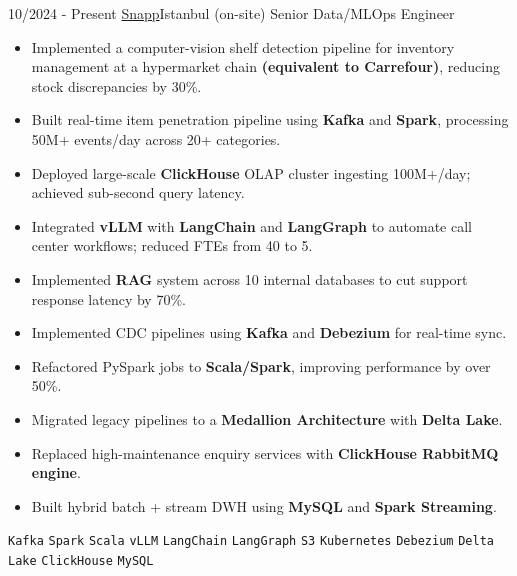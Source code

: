 \documentclass[9pt]{developercv} %
\begin{document}
\vspace{-5pt}
\begin{entrylist}
  \entry
    {10/2024 - Present}
    {\href{https://snapp.ir}{Snapp}\newline\small\textnormal{Istanbul (on-site)}}
    {Senior Data/MLOps Engineer}
    {\vspace{-6pt}
    \begin{itemize}[itemsep=2pt,topsep=0pt,parsep=0pt,partopsep=0pt, leftmargin=-1pt]
        \item Implemented a computer-vision shelf detection pipeline for inventory management at a hypermarket chain \textbf{(equivalent to Carrefour)}, reducing stock discrepancies by 30\%.
        \item Built real-time item penetration pipeline using \textbf{Kafka} and \textbf{Spark}, processing 50M+ events/day across 20+ categories.
        \item Deployed large-scale \textbf{ClickHouse} OLAP cluster ingesting 100M+/day; achieved sub-second query latency.
        \item Integrated \textbf{vLLM} with \textbf{LangChain} and \textbf{LangGraph} to automate call center workflows; reduced FTEs from 40 to 5.
        \item Implemented \textbf{RAG} system across 10 internal databases to cut support response latency by 70\%.
        \item Implemented CDC pipelines using \textbf{Kafka} and \textbf{Debezium} for real-time sync.
        \item Refactored PySpark jobs to \textbf{Scala/Spark}, improving performance by over 50\%.
        \item Migrated legacy pipelines to a \textbf{Medallion Architecture} with \textbf{Delta Lake}.
        \item Replaced high-maintenance enquiry services with \textbf{ClickHouse RabbitMQ engine}.
        \item Built hybrid batch + stream DWH using \textbf{MySQL} and \textbf{Spark Streaming}.
    \end{itemize}
    \vspace{2pt}
    \texttt{Kafka} \slashsep \texttt{Spark} \slashsep \texttt{Scala} \slashsep \texttt{vLLM} \slashsep \texttt{LangChain} \slashsep \texttt{LangGraph} \slashsep \texttt{S3} \slashsep \texttt{Kubernetes} \slashsep \texttt{Debezium} \slashsep \texttt{Delta Lake} \slashsep \texttt{ClickHouse} \slashsep \texttt{MySQL}
    }
\end{entrylist}
\end{document}
